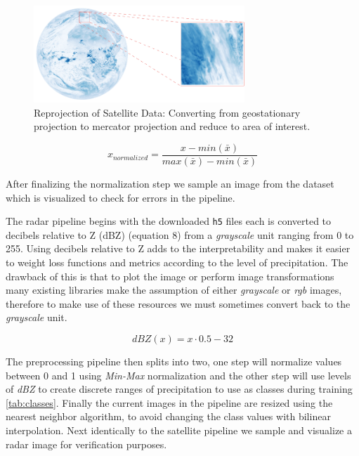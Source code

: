 \begin{figure}
  \centering
  \includegraphics[width=225pt]{./images/reprored.png}
  \caption{Reprojection of Satellite Data: Converting from geostationary projection to mercator projection and reduce to area of interest.}
  \label{fig:reprojection}
\end{figure}


\begin{equation}
  x_{normalized} = \frac{x-min(\bar{x})}{max(\bar{x})-min(\bar{x})}
\end{equation}

After finalizing the normalization step we sample an image from the dataset which is visualized to check for errors in the pipeline.
\medskip

The radar pipeline begins with the downloaded \texttt{h5} files
each is converted to decibels relative to Z (dBZ) (equation 8) from a \textit{grayscale} unit ranging from 0 to 255.
Using decibels relative to Z adds to the interpretability  and makes it easier to weight loss functions and metrics
according to the level of precipitation. The drawback of this is that to plot the image or perform image transformations many
existing libraries make the assumption of either \textit{grayscale} or \textit{rgb} images, therefore to make use of these resources we must sometimes convert back to the \textit{grayscale} unit. 

\begin{equation}
  dBZ(x) = x \cdot 0.5 - 32
\end{equation}

The preprocessing pipeline then splits into two, one step will normalize values between 0 and 1 using \textit{Min-Max} normalization and the other step will use levels of \textit{dBZ} to create discrete ranges of precipitation to use as classes during training \ref{tab:classes}.
Finally the current images in the pipeline are resized using the nearest neighbor algorithm, to avoid changing the class values with bilinear interpolation.
Next identically to the satellite pipeline we sample and visualize a radar image for verification purposes.

